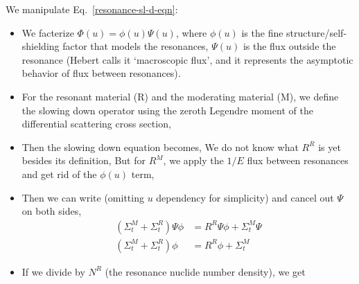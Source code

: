\documentclass{school-22.211-notes}
\begin{document}
We manipulate Eq.~\ref{resonance-sl-d-eqn}:
\begin{itemize}
\item We facterize $\Phi(u) = \phi(u) \Psi(u)$, where $\phi(u)$ is the fine structure/self-shielding factor that models the resonances, $\Psi(u)$ is the flux outside the resonance (Hebert calls it `macroscopic flux', and it represents the asymptotic behavior of flux between resonances). 

\item For the resonant material (R) and the moderating material (M), we define the slowing down operator using the zeroth Legendre moment of the differential scattering cross section, 

\item Then the slowing down equation becomes, 
  We do not know what $R^R$ is yet besides its definition,
  But for $R^M$, we apply the $1/E$ flux between resonances and get rid of the $\phi(u)$ term, 

\item Then we can write (omitting $u$ dependency for simplicity) and cancel out $\Psi$ on both sides, 
  \begin{align}
    (\Sigma_{t}^M + \Sigma_t^R) \Psi \phi &= R^R \Psi \phi +  \Sigma_{t}^M \Psi  \\
   (\Sigma_t^M  + \Sigma_{t}^R ) \phi &=  R^R \phi + \Sigma_t^M  
  \end{align}

\item If we divide by $N^R$ (the resonance nuclide number density), we get 
\end{itemize}
\end{document}

